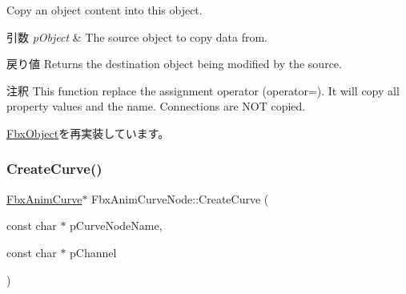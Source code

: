 Copy an object content into this object. 
\begin{DoxyParams}{引数}
{\em p\+Object} & The source object to copy data from. \\
\hline
\end{DoxyParams}
\begin{DoxyReturn}{戻り値}
Returns the destination object being modified by the source. 
\end{DoxyReturn}
\begin{DoxyRemark}{注釈}
This function replace the assignment operator (operator=). It will copy all property values and the name. Connections are N\+OT copied. 
\end{DoxyRemark}


\hyperlink{class_fbx_object_a0c0c5adb38284d14bb82c04d54504a3e}{Fbx\+Object}を再実装しています。

\mbox{\label{class_fbx_anim_curve_node_af3600f3846c38a82b0ea6491c9b2857f}} 
\subsubsection{\texorpdfstring{Create\+Curve()}{CreateCurve()}\hspace{0.1cm}{\footnotesize\ttfamily [1/2]}}
{\footnotesize\ttfamily \hyperlink{class_fbx_anim_curve}{Fbx\+Anim\+Curve}$\ast$ Fbx\+Anim\+Curve\+Node\+::\+Create\+Curve (\begin{DoxyParamCaption}\item[{const char $\ast$}]{p\+Curve\+Node\+Name,  }\item[{const char $\ast$}]{p\+Channel }\end{DoxyParamCaption})}

